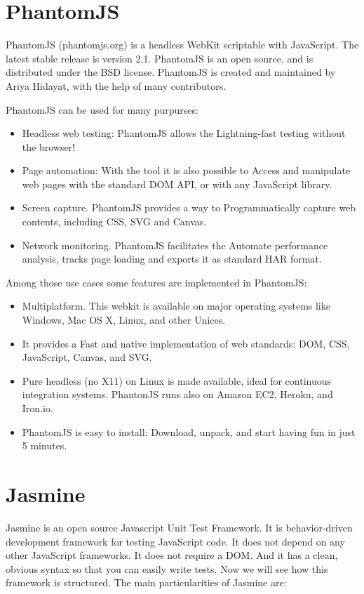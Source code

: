 \documentclass[11pt]{article}
\begin{document}
\section{PhantomJS}

PhantomJS (phantomjs.org) is a headless WebKit scriptable with JavaScript. The latest stable release is version 2.1. PhantomJS is an open source, and is distributed under the BSD license. PhantomJS is created and maintained by Ariya Hidayat, with the help of many contributors.

PhantomJS can be used for many purpurses:

\begin{itemize}
\item Headless web testing: PhantomJS allows the Lightning-fast testing without the browser!
\item Page automation: With the tool it is also possible to Access and manipulate web pages with the standard DOM API, or with any JavaScript library.
\item Screen capture. PhantomJS provides a way to Programmatically capture web contents, including CSS, SVG and Canvas.
\item Network monitoring. PhantomJS facilitates the Automate performance analysis, tracks page loading and exports it as standard HAR format.
\end{itemize}

Among those use cases some features are implemented in PhantomJS:

\begin{itemize}
\item Multiplatform. This webkit is available on major operating systems like Windows, Mac OS X, Linux, and other Unices.
\item It provides a Fast and native implementation of web standards: DOM, CSS, JavaScript, Canvas, and SVG.
\item Pure headless (no X11) on Linux is made available, ideal for continuous integration systems. PhantonJS runs also on Amazon EC2, Heroku, and Iron.io.
\item PhantomJS is easy to install: Download, unpack, and start having fun in just 5 minutes.
\end{itemize}

\section{Jasmine}

Jasmine is an open source Javascript Unit Test Framework. It is behavior-driven development framework for testing JavaScript code. It does not depend on any other JavaScript frameworks. It does not require a DOM. And it has a clean, obvious syntax so that you can easily write tests. Now we will see how this framework is structured. The main particularities of Jasmine are:
\end{document}
